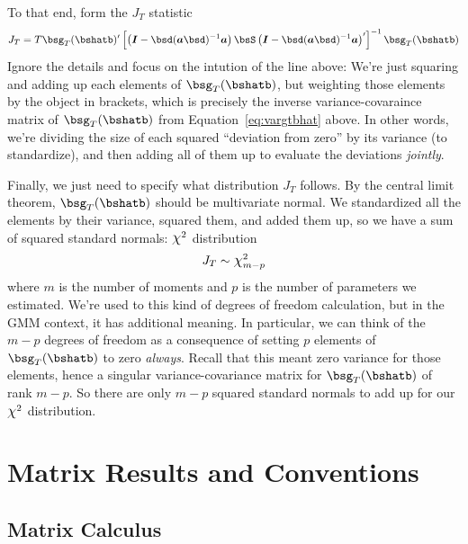 \documentclass[12pt]{article}
\theoremstyle{plain}
\theoremstyle{definition}
\theoremstyle{remark}
\newcommand*{\Chi}{\mbox{\large$\chi$}} %
\begin{document}
To that end, form the $J_T$ statistic
\begin{align}
  J_T =
  T
  \bsg_T(\bshatb)'
  \left[
  \left(
    \boldsymbol{I}-\bsd(\boldsymbol{a}\bsd)^{-1}
    \boldsymbol{a}
  \right)
  \bsS
  \left(
    \boldsymbol{I}-\bsd(\boldsymbol{a}\bsd)^{-1}
    \boldsymbol{a}
  \right)'
  \right]^{-1}
  \bsg_T(\bshatb)
  \label{eq:jtest}
\end{align}
Ignore the details and focus on the intution of the line above: We're
just squaring and adding up each elements of
$\bsg_T(\bshatb)$, but weighting those elements
by the object in brackets, which is precisely the inverse
variance-covaraince matrix of $\bsg_T(\bshatb)$
from Equation~\ref{eq:vargtbhat} above.  In other words, we're dividing
the size of each squared ``deviation from zero'' by its variance (to
standardize), and then adding all of them up to evaluate the deviations
\emph{jointly}.

Finally, we just need to specify what distribution $J_T$ follows. By the
central limit theorem, $\bsg_T(\bshatb)$ should
be multivariate normal. We standardized all the elements by their
variance, squared them, and added them up, so we have a sum of squared
standard normals: $\Chi^2$ distribution
\begin{align*}
  J_T \sim \Chi^2_{m-p}
\end{align*}
where $m$ is the number of moments and $p$ is the number of parameters
we estimated. We're used to this kind of degrees of freedom calculation,
but in the GMM context, it has additional meaning. In particular, we can
think of the $m-p$ degrees of freedom as a consequence of setting $p$
elements of $\bsg_T(\bshatb)$ to zero
\emph{always}. Recall that this meant zero variance for those elements,
hence a singular variance-covariance matrix for
$\bsg_T(\bshatb)$ of rank $m-p$. So there are
only $m-p$ squared standard normals to add up for our $\Chi^2$
distribution.




\clearpage
\appendix

\section{Matrix Results and Conventions}

\subsection{Matrix Calculus}
\end{document}

